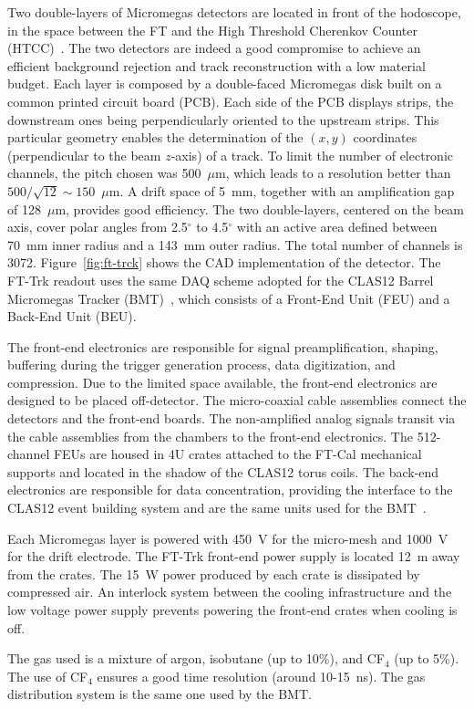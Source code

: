 Two double-layers of Micromegas detectors are located in front of the hodoscope, in the space between the FT
and the High Threshold Cherenkov Counter (HTCC)~\cite{htcc}. The two detectors are indeed a good compromise
to achieve an efficient background rejection and track reconstruction with a low material budget. Each layer is
composed by a double-faced Micromegas disk built on a common printed circuit board (PCB). Each side of the PCB
displays strips, the downstream ones being perpendicularly oriented to the upstream strips. This particular geometry
enables the determination of the $(x,y)$ coordinates (perpendicular to the beam $z$-axis) of a track. To limit the
number of electronic channels, the pitch chosen was 500~$\mu$m, which leads to a resolution better than
$500/\sqrt{12} \sim 150$~$\mu$m. A drift space of 5~mm, together with an amplification gap of 128~$\mu$m,
provides good efficiency. The two double-layers, centered on the beam axis, cover polar angles from 2.5$^\circ$ to
4.5$^\circ$ with an active area defined between 70~mm inner radius and a 143~mm outer radius. The total number of
channels is 3072. Figure~\ref{fig:ft-trck} shows the CAD implementation of the detector. The FT-Trk readout uses
the same DAQ scheme adopted for the CLAS12 Barrel Micromegas Tracker (BMT)~\cite{mm}, which consists of
a Front-End Unit (FEU) and a Back-End Unit (BEU). 

The front-end electronics are responsible for signal preamplification, shaping, buffering during the trigger generation
process, data digitization, and compression. Due to the limited space available, the front-end electronics are designed
to be placed off-detector. The micro-coaxial cable assemblies connect the detectors and the front-end boards. The
non-amplified analog signals transit via the cable assemblies from the chambers to the front-end electronics. The
512-channel FEUs are housed in 4U crates attached to the FT-Cal mechanical supports and  located in the shadow of
the CLAS12 torus coils. The back-end electronics are responsible for data concentration, providing the interface to
the CLAS12 event building system and are the same units used for the BMT~\cite{mm}.

Each Micromegas layer is powered with 450~V for the micro-mesh and 1000~V for the drift electrode. The FT-Trk
front-end power supply is located 12~m away from the crates. The 15~W power produced by each crate is dissipated by
compressed air. An interlock system between the cooling infrastructure and the low voltage power supply prevents
powering the front-end crates when cooling is off. 

The gas used is a mixture of argon, isobutane (up to 10\%), and CF$_4$ (up to 5\%). The use of CF$_4$ ensures a
good time resolution (around 10-15~ns). The gas distribution system is the same one used by the BMT.
